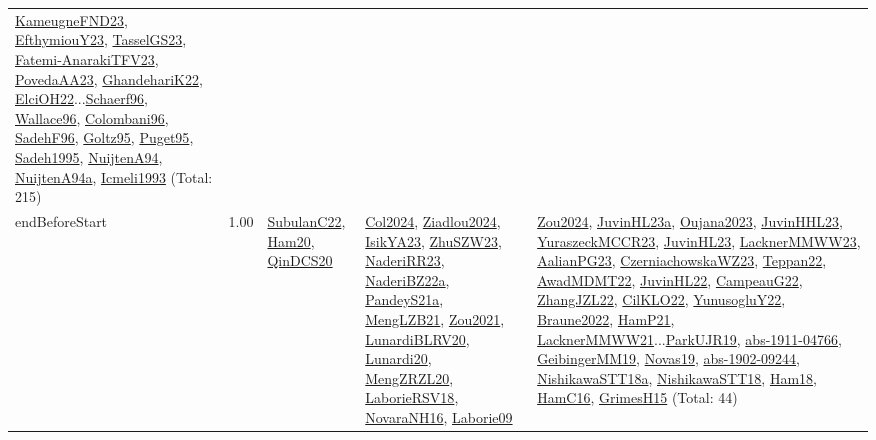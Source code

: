 {\begin{longtable}{p{3cm}r>{\raggedright\arraybackslash}p{6cm}>{\raggedright\arraybackslash}p{6cm}>{\raggedright\arraybackslash}p{8cm}}
\hyperref[detail:KameugneFND23]{KameugneFND23}, \hyperref[detail:EfthymiouY23]{EfthymiouY23}, \hyperref[detail:TasselGS23]{TasselGS23}, \hyperref[detail:Fatemi-AnarakiTFV23]{Fatemi-AnarakiTFV23}, \hyperref[detail:PovedaAA23]{PovedaAA23}, \hyperref[detail:GhandehariK22]{GhandehariK22}, \hyperref[detail:ElciOH22]{ElciOH22}...\hyperref[detail:Schaerf96]{Schaerf96}, \hyperref[detail:Wallace96]{Wallace96}, \hyperref[detail:Colombani96]{Colombani96}, \hyperref[detail:SadehF96]{SadehF96}, \hyperref[detail:Goltz95]{Goltz95}, \hyperref[detail:Puget95]{Puget95}, \hyperref[detail:Sadeh1995]{Sadeh1995}, \hyperref[detail:NuijtenA94]{NuijtenA94}, \hyperref[detail:NuijtenA94a]{NuijtenA94a}, \hyperref[detail:Icmeli1993]{Icmeli1993} (Total: 215)\\
\index{endBeforeStart}\index{Constraints!endBeforeStart}endBeforeStart &  1.00 & \hyperref[detail:SubulanC22]{SubulanC22}, \hyperref[detail:Ham20]{Ham20}, \hyperref[detail:QinDCS20]{QinDCS20} & \hyperref[detail:Col2024]{Col2024}, \hyperref[detail:Ziadlou2024]{Ziadlou2024}, \hyperref[detail:IsikYA23]{IsikYA23}, \hyperref[detail:ZhuSZW23]{ZhuSZW23}, \hyperref[detail:NaderiRR23]{NaderiRR23}, \hyperref[detail:NaderiBZ22a]{NaderiBZ22a}, \hyperref[detail:PandeyS21a]{PandeyS21a}, \hyperref[detail:MengLZB21]{MengLZB21}, \hyperref[detail:Zou2021]{Zou2021}, \hyperref[detail:LunardiBLRV20]{LunardiBLRV20}, \hyperref[detail:Lunardi20]{Lunardi20}, \hyperref[detail:MengZRZL20]{MengZRZL20}, \hyperref[detail:LaborieRSV18]{LaborieRSV18}, \hyperref[detail:NovaraNH16]{NovaraNH16}, \hyperref[detail:Laborie09]{Laborie09} & \hyperref[detail:Zou2024]{Zou2024}, \hyperref[detail:JuvinHL23a]{JuvinHL23a}, \hyperref[detail:Oujana2023]{Oujana2023}, \hyperref[detail:JuvinHHL23]{JuvinHHL23}, \hyperref[detail:YuraszeckMCCR23]{YuraszeckMCCR23}, \hyperref[detail:JuvinHL23]{JuvinHL23}, \hyperref[detail:LacknerMMWW23]{LacknerMMWW23}, \hyperref[detail:AalianPG23]{AalianPG23}, \hyperref[detail:CzerniachowskaWZ23]{CzerniachowskaWZ23}, \hyperref[detail:Teppan22]{Teppan22}, \hyperref[detail:AwadMDMT22]{AwadMDMT22}, \hyperref[detail:JuvinHL22]{JuvinHL22}, \hyperref[detail:CampeauG22]{CampeauG22}, \hyperref[detail:ZhangJZL22]{ZhangJZL22}, \hyperref[detail:CilKLO22]{CilKLO22}, \hyperref[detail:YunusogluY22]{YunusogluY22}, \hyperref[detail:Braune2022]{Braune2022}, \hyperref[detail:HamP21]{HamP21}, \hyperref[detail:LacknerMMWW21]{LacknerMMWW21}...\hyperref[detail:ParkUJR19]{ParkUJR19}, \hyperref[detail:abs-1911-04766]{abs-1911-04766}, \hyperref[detail:GeibingerMM19]{GeibingerMM19}, \hyperref[detail:Novas19]{Novas19}, \hyperref[detail:abs-1902-09244]{abs-1902-09244}, \hyperref[detail:NishikawaSTT18a]{NishikawaSTT18a}, \hyperref[detail:NishikawaSTT18]{NishikawaSTT18}, \hyperref[detail:Ham18]{Ham18}, \hyperref[detail:HamC16]{HamC16}, \hyperref[detail:GrimesH15]{GrimesH15} (Total: 44)\\

\end{longtable}}
